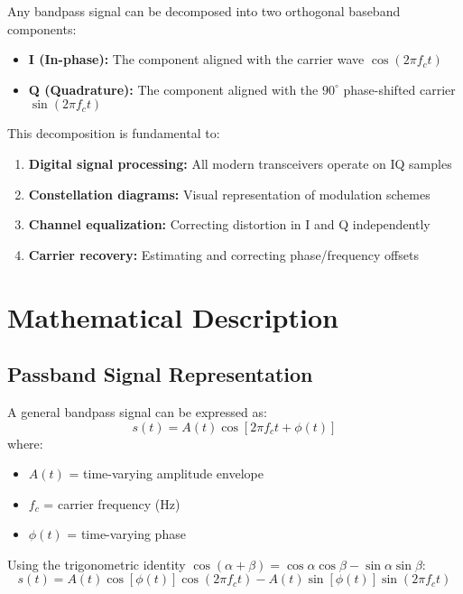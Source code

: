 Any bandpass signal can be decomposed into two orthogonal baseband components:
\begin{itemize}
\item \textbf{I (In-phase):} The component aligned with the carrier wave $\cos(2\pi f_c t)$
\item \textbf{Q (Quadrature):} The component aligned with the $90^\circ$ phase-shifted carrier $\sin(2\pi f_c t)$
\end{itemize}

This decomposition is fundamental to:
\begin{enumerate}
\item \textbf{Digital signal processing:} All modern transceivers operate on IQ samples
\item \textbf{Constellation diagrams:} Visual representation of modulation schemes
\item \textbf{Channel equalization:} Correcting distortion in I and Q independently
\item \textbf{Carrier recovery:} Estimating and correcting phase/frequency offsets
\end{enumerate}

\section{Mathematical Description}

\subsection{Passband Signal Representation}

A general bandpass signal can be expressed as:
\begin{equation}
s(t) = A(t) \cos[2\pi f_c t + \phi(t)]
\end{equation}
where:
\begin{itemize}
\item $A(t)$ = time-varying amplitude envelope
\item $f_c$ = carrier frequency (Hz)
\item $\phi(t)$ = time-varying phase
\end{itemize}

Using the trigonometric identity $\cos(\alpha + \beta) = \cos\alpha\cos\beta - \sin\alpha\sin\beta$:
\begin{equation}
s(t) = A(t)\cos[\phi(t)] \cos(2\pi f_c t) - A(t)\sin[\phi(t)] \sin(2\pi f_c t)
\end{equation}

